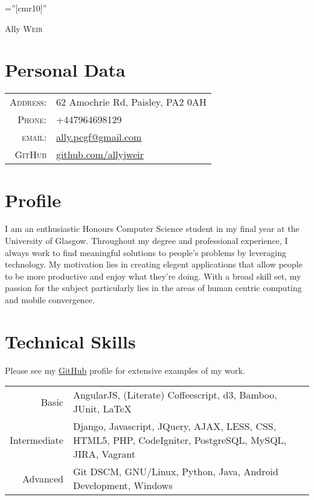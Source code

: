 \documentclass[a4paper,10pt]{article}
\begin{document}

\pagestyle{empty} %

\font\fb=''[cmr10]'' %

\par{\centering
		{\Huge Ally \textsc{Weir}
	}\bigskip\par}

\section{Personal Data}

\begin{tabular}{rl}
    \textsc{Address:}   & 62 Amochrie Rd, Paisley, PA2 0AH \\
    \textsc{Phone:}     & +447964698129\\
    \textsc{email:}     & \href{mailto:ally.pcgf+grad@gmail.com}{ally.pcgf@gmail.com} \\
    \textsc{GitHub}     & \href{http://www.github.com/allyjweir}{github.com/allyjweir}
\end{tabular}

\section{Profile}
I am an enthusiastic Honours Computer Science student in my final year at the University of Glasgow. Throughout my degree and professional experience, I always work to find meaningful solutions to people's problems by leveraging technology. My motivation lies in creating elegent applications that allow people to be more productive and enjoy what they're doing. With a broad skill set, my passion for the subject particularly lies in the areas of human centric computing and mobile convergence.

\section{Technical Skills}
Please see my \hyperlink{https://github.com/allyjweir}{GitHub}  profile for extensive examples of my work.
\bigskip\\
\begin{tabular}{r|p{11cm}}
Basic & AngularJS, (Literate) Coffeescript, d3, Bamboo, JUnit, LaTeX \\
Intermediate & Django, Javascript, JQuery, AJAX, LESS, CSS, HTML5, PHP, CodeIgniter, PostgreSQL, MySQL, JIRA, Vagrant   \\
Advanced & Git DSCM, GNU/Linux, Python, Java, Android Development, Windows
\end{tabular}
\end{document}
